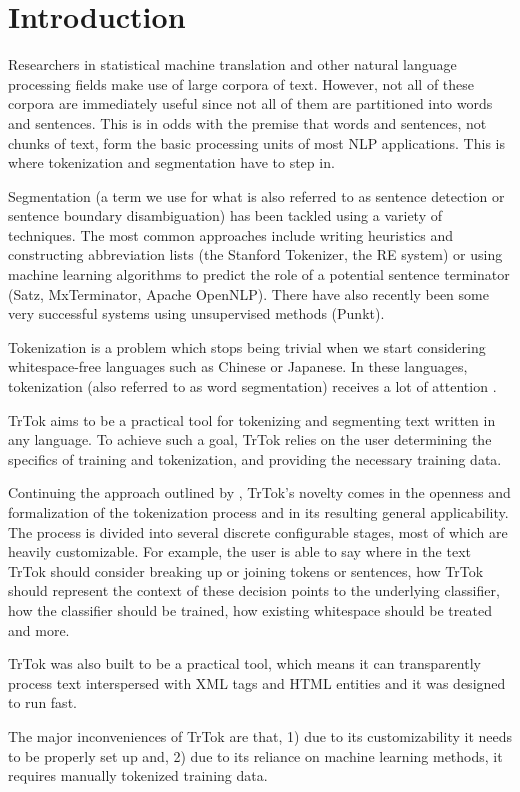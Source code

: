 \section{Introduction}
\label{sec:introduction}

Researchers in statistical machine translation and other natural
language processing fields make use of large corpora of text. However,
not all of these corpora are immediately useful since not all of them
are partitioned into words and sentences. This is in odds with the
premise that words and sentences, not chunks of text, form the basic
processing units of most NLP applications. This is where tokenization
and segmentation have to step in.

Segmentation (a term we use for what is also referred to as sentence
detection or sentence boundary disambiguation) has been tackled using
a variety of techniques. The most common approaches include writing
heuristics and constructing abbreviation lists (the Stanford
Tokenizer, the RE system) or using machine learning algorithms to
predict the role of a potential sentence terminator (Satz,
MxTerminator, Apache OpenNLP). There have also recently been some very
successful systems using unsupervised methods (Punkt).

Tokenization is a problem which stops being trivial when we start
considering whitespace-free languages such as Chinese or Japanese. In
these languages, tokenization (also referred to as word segmentation)
receives a lot of attention \cite{seg-bakeoff}.

TrTok aims to be a practical tool for tokenizing and segmenting text
written in any language. To achieve such a goal, TrTok relies on the
user determining the specifics of training and tokenization, and
providing the necessary training data.

Continuing the approach outlined by \citet{sbd-trtok-orig}, TrTok's
novelty comes in the openness and formalization of the tokenization
process and in its resulting general applicability. The process is
divided into several discrete configurable stages, most of which are
heavily customizable. For example, the user is able to say where in
the text TrTok should consider breaking up or joining tokens or
sentences, how TrTok should represent the context of these decision
points to the underlying classifier, how the classifier should be
trained, how existing whitespace should be treated and more.

TrTok was also built to be a practical tool, which means it can
transparently process text interspersed with XML tags and HTML
entities and it was designed to run fast.

The major inconveniences of TrTok are that, 1) due to its
customizability it needs to be properly set up and, 2) due to its
reliance on machine learning methods, it requires manually tokenized
training data.
